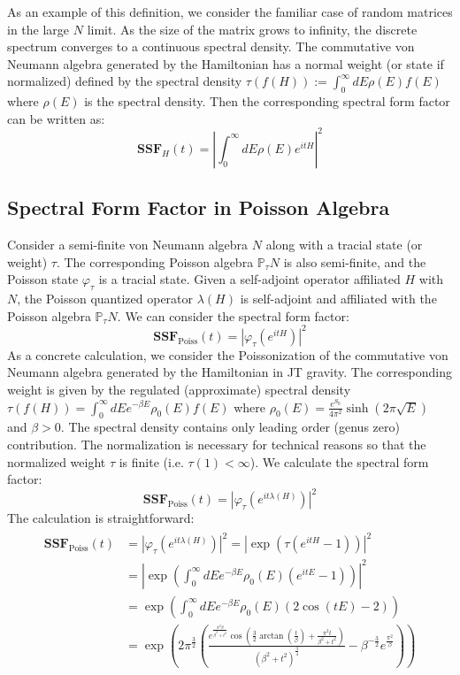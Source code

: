 \documentclass[a4paper,11pt]{article}
\theoremstyle{definition}
\numberwithin{equation}{section}
\newcommand{\lb}{\left(}
\newcommand{\rb}{\right)}
\begin{document}
As an example of this definition, we consider the familiar case of random matrices in the large $N$ limit. As the size of the matrix grows to infinity, the discrete spectrum converges to a continuous spectral density. The commutative von Neumann algebra generated by the Hamiltonian has a normal weight (or state if normalized) defined by the spectral density $\tau(f(H)) := \int_0^\infty dE\rho(E)f(E)$ where $\rho(E)$ is the spectral density. Then the corresponding spectral form factor can be written as:
\begin{equation}
    \textbf{SSF}_H(t) = |\int_0^\infty dE\rho(E)e^{itH}|^2
\end{equation}
\subsection{Spectral Form Factor in Poisson Algebra}
Consider a semi-finite von Neumann algebra $N$ along with a tracial state (or weight) $\tau$. The corresponding Poisson algebra $\mathbb{P}_\tau N$ is also semi-finite, and the Poisson state $\varphi_\tau$ is a tracial state. Given a self-adjoint operator affiliated $H$ with $N$, the Poisson quantized operator $\lambda(H)$ is self-adjoint and affiliated with the Poisson algebra $\mathbb{P}_\tau N$. We can consider the spectral form factor:
\begin{equation}
    \textbf{SSF}_\text{Poiss}(t) = |\varphi_\tau(e^{itH})|^2
\end{equation}
As a concrete calculation, we consider the Poissonization of the commutative von Neumann algebra generated by the Hamiltonian in JT gravity. The corresponding weight is given by the regulated (approximate) spectral density $\tau(f(H)) = \int_0^\infty dE e^{-\beta E}\rho_0(E)f(E)$ where $\rho_0(E) = \frac{e^{S_0}}{4\pi^2}\sinh(2\pi\sqrt{E})$ and $\beta > 0$. The spectral density contains only leading order (genus zero) contribution. The normalization is necessary for technical reasons so that the normalized weight $\tau$ is finite (i.e. $\tau(1) < \infty$). We calculate the spectral form factor:
\begin{equation}
    \textbf{SSF}_\text{Poiss}(t) = |\varphi_\tau(e^{it\lambda(H)})|^2
\end{equation}
The calculation is straightforward:
\begin{align}
    \begin{split}
        \textbf{SSF}_\text{Poiss}(t) &= |\varphi_\tau(e^{it\lambda(H)})|^2 
        =|\exp(\tau(e^{itH} - 1))|^2
        \\&
        =|\exp(\int_0^\infty dE e^{-\beta E}\rho_0(E)(e^{itE} - 1))|^2
        \\&
        =\exp(\int_0^\infty dE e^{-\beta E}\rho_0(E)(2\cos(tE) - 2))
        \\&
        =\exp\lb 2\pi^{\frac{3}{2}}\lb \frac{e^{\frac{\pi^2\beta}{\beta^2 + t^2}}\cos(\frac{3}{2}\arctan(\frac{t}{\beta}) + \frac{\pi^2 t}{\beta^2 + t^2})}{(\beta^2 + t^2)^{\frac{3}{4}}} - \beta^{-\frac{3}{2}}e^{\frac{\pi^2}{\beta}} \rb \rb
    \end{split}
\end{align}
\end{document}
